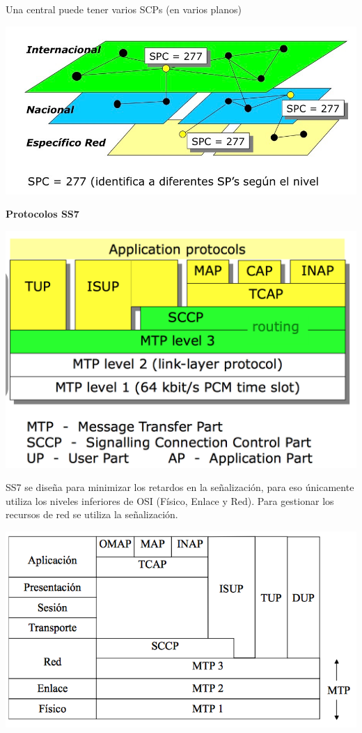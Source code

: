 \documentclass[10pt,portrait, twocolumn]{article}
\begin{document}
Una central puede tener varios SCPs (en varios planos)

	\begin{center}
		\includegraphics[scale = 0.2]{NivelesSS7}
	\end{center}

\textbf{Protocolos SS7}

	\begin{center}
		\includegraphics[scale = 0.3]{SS72}
	\end{center}

SS7 se diseña para minimizar los retardos en la señalización, para eso únicamente utiliza los niveles inferiores de OSI (Físico, Enlace y Red). Para gestionar los recursos de red se utiliza la señalización.
	
	\begin{center}
		\includegraphics[scale = 0.5]{SS7OSI}
	\end{center}
\end{document}
